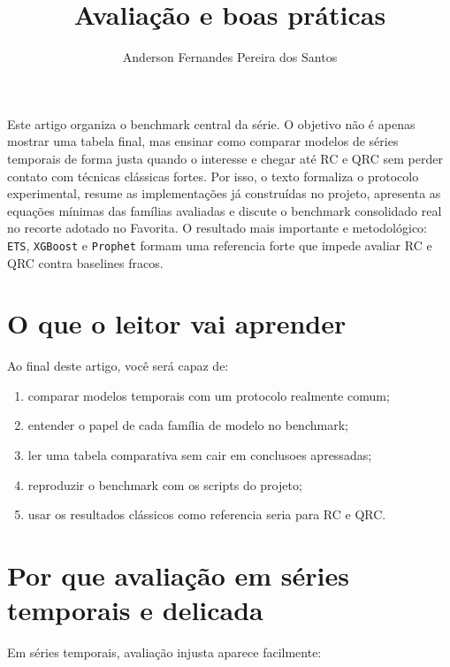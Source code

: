 \documentclass[12pt]{article}
\title{Avaliação e boas práticas}
\author{Anderson Fernandes Pereira dos Santos}
\providecommand{\tightlist}{%
              \setlength{\itemsep}{0pt}\setlength{\parskip}{0pt}}
\begin{document}
            \maketitle

            \begin{resumo}
            Este artigo organiza o benchmark central da série. O objetivo não é apenas mostrar uma tabela final, mas ensinar como comparar modelos de séries temporais de forma justa quando o interesse e chegar até RC e QRC sem perder contato com técnicas clássicas fortes. Por isso, o texto formaliza o protocolo experimental, resume as implementações já construídas no projeto, apresenta as equações mínimas das famílias avaliadas e discute o benchmark consolidado real no recorte adotado no Favorita. O resultado mais importante e metodológico: \texttt{ETS}, \texttt{XGBoost} e \texttt{Prophet} formam uma referencia forte que impede avaliar RC e QRC contra baselines fracos.
            \end{resumo}

            \section{O que o leitor vai aprender}\label{1-o-que-o-leitor-vai-aprender}

Ao final deste artigo, você será capaz de:

\begin{enumerate}
\def\labelenumi{\arabic{enumi}.}
\tightlist
\item
  comparar modelos temporais com um protocolo realmente comum;
\item
  entender o papel de cada família de modelo no benchmark;
\item
  ler uma tabela comparativa sem cair em conclusoes apressadas;
\item
  reproduzir o benchmark com os scripts do projeto;
\item
  usar os resultados clássicos como referencia seria para RC e QRC.
\end{enumerate}

\section{Por que avaliação em séries temporais e delicada}\label{2-por-que-avaliauxe7uxe3o-em-suxe9ries-temporais-e-delicada}

Em séries temporais, avaliação injusta aparece facilmente:
\end{document}

